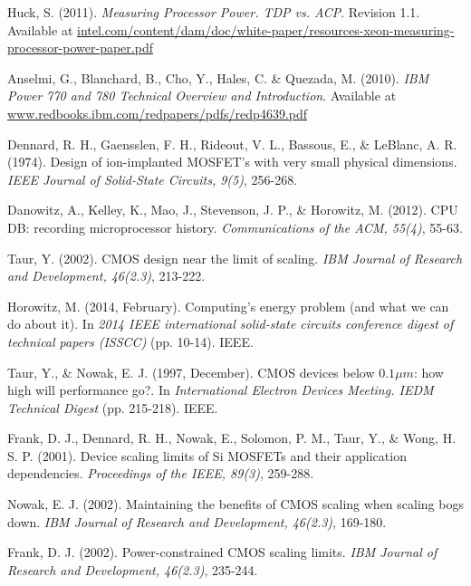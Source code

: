 \documentclass[12pt,a4paper]{article} %
\begin{document}
{\begin{thebibliography}{56}
    Huck, S. (2011). \textit{Measuring Processor Power. TDP vs. ACP}. Revision 1.1. Available at \url{intel.com/content/dam/doc/white-paper/resources-xeon-measuring-processor-power-paper.pdf}
    
    Anselmi, G., Blanchard, B., Cho, Y., Hales, C. \& Quezada, M. (2010). \textit{IBM Power 770 and 780 Technical Overview and Introduction}. Available at \url{www.redbooks.ibm.com/redpapers/pdfs/redp4639.pdf}
    
    Dennard, R. H., Gaensslen, F. H., Rideout, V. L., Bassous, E., \& LeBlanc, A. R. (1974). Design of ion-implanted MOSFET's with very small physical dimensions.\textit{ IEEE Journal of Solid-State Circuits, 9(5)}, 256-268.
    
    Danowitz, A., Kelley, K., Mao, J., Stevenson, J. P., \& Horowitz, M. (2012). CPU DB: recording microprocessor history. \textit{Communications of the ACM, 55(4)}, 55-63.
    
    Taur, Y. (2002). CMOS design near the limit of scaling. \textit{IBM Journal of Research and Development, 46(2.3)}, 213-222.
    
    Horowitz, M. (2014, February). Computing's energy problem (and what we can do about it). In \textit{2014 IEEE international solid-state circuits conference digest of technical papers (ISSCC)} (pp. 10-14). IEEE.
    
    Taur, Y., \& Nowak, E. J. (1997, December). CMOS devices below $0.1\mu m$: how high will performance go?. In \textit{International Electron Devices Meeting. IEDM Technical Digest }(pp. 215-218). IEEE.
    
    Frank, D. J., Dennard, R. H., Nowak, E., Solomon, P. M., Taur, Y., \& Wong, H. S. P. (2001). Device scaling limits of Si MOSFETs and their application dependencies. \textit{Proceedings of the IEEE, 89(3)}, 259-288.
    
    Nowak, E. J. (2002). Maintaining the benefits of CMOS scaling when scaling bogs down. \textit{IBM Journal of Research and Development, 46(2.3)}, 169-180.
    
    Frank, D. J. (2002). Power-constrained CMOS scaling limits. \textit{IBM Journal of Research and Development, 46(2.3)}, 235-244.
    

\end{thebibliography}}
\end{document}
